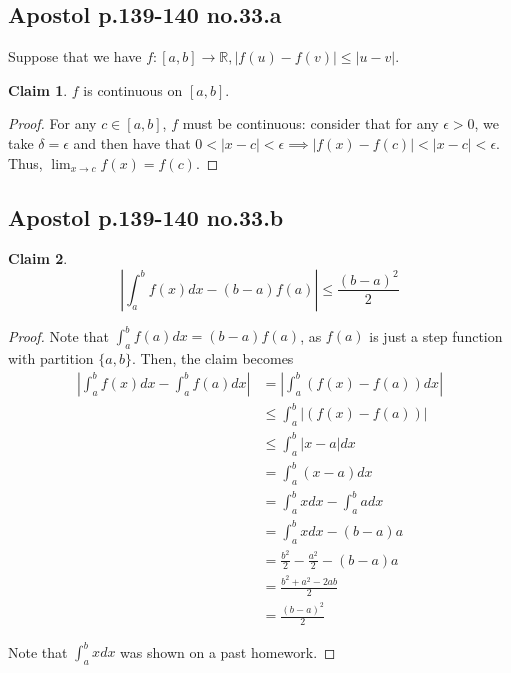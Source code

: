 \documentclass[12pt,letterpaper]{article}
\theoremstyle{definition}
\newtheorem*{claim}{Claim}
\newcommand{\R}{\mathbb{R}}
\begin{document}
\subsection*{Apostol p.139-140 no.33.a}

Suppose that we have $f:[a,b] \rightarrow \R, |f(u)-f(v)| \leq |u-v|$.

\begin{claim}
  $f$ is continuous on $[a,b]$.
\end{claim}

\begin{proof}
  For any $c \in [a,b]$, $f$ must be continuous: consider that for any $\epsilon
  > 0$, we take $\delta = \epsilon$ and then have that $0 < |x - c| < \epsilon
  \implies |f(x) - f(c)| < |x - c| < \epsilon$. Thus, $\lim_{x\rightarrow c}f(x)
  = f(c)$.
\end{proof}

\subsection*{Apostol p.139-140 no.33.b}

\begin{claim}
  \[
    \left| \int_a^bf(x)dx - (b-a)f(a) \right| \leq \frac{(b-a)^2}{2}
  \]
\end{claim}

\begin{proof}
  Note that $\int_a^bf(a)dx = (b-a)f(a)$, as $f(a)$ is just a step function with
  partition $\{a,b\}$. Then, the claim becomes
  \begin{align*}
    \left|\int_a^bf(x)dx - \int_a^bf(a)dx\right| &= \left|\int_a^b(f(x) - f(a))dx\right| \\
                                                 &\leq \int_a^b|(f(x) - f(a))| \\
                                                 &\leq \int_a^b|x - a|dx \\
                                                 &= \int_a^b(x-a)dx \\
                                                 &= \int_a^bxdx - \int_a^badx \\
                                                 &= \int_a^b xdx - (b-a)a \\
                                                 &= \frac{b^2}{2} - \frac{a^2}{2} - (b-a)a \\
                                                 &= \frac{b^2 + a^2 -2ab}{2} \\
                                                 &= \frac{(b-a)^2}{2}
  \end{align*}

  Note that $\int_a^bxdx$ was shown on a past homework.
\end{proof}
\end{document}
